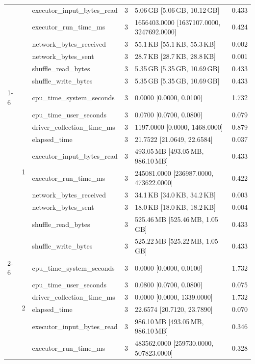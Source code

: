 \begin{tabular}{lllrll}
 &  & executor_input_bytes_read & 3 & 5.06\,GB [5.06\,GB, 10.12\,GB] & 0.433 \\
 &  & executor_run_time_ms & 3 & 1656403.0000 [1637107.0000, 3247692.0000] & 0.424 \\
 &  & network_bytes_received & 3 & 55.1\,KB [55.1\,KB, 55.3\,KB] & 0.002 \\
 &  & network_bytes_sent & 3 & 28.7\,KB [28.7\,KB, 28.8\,KB] & 0.001 \\
 &  & shuffle_read_bytes & 3 & 5.35\,GB [5.35\,GB, 10.69\,GB] & 0.433 \\
 &  & shuffle_write_bytes & 3 & 5.35\,GB [5.35\,GB, 10.69\,GB] & 0.433 \\
\cline{1-6} \cline{2-6}
\multirow[t]{30}{*}{national-scale-spatial-join-databricks-broadcast-4-nodes-small} & \multirow[t]{10}{*}{1} & cpu_time_system_seconds & 3 & 0.0000 [0.0000, 0.0100] & 1.732 \\
 &  & cpu_time_user_seconds & 3 & 0.0700 [0.0700, 0.0800] & 0.079 \\
 &  & driver_collection_time_ms & 3 & 1197.0000 [0.0000, 1468.0000] & 0.879 \\
 &  & elapsed_time & 3 & 21.7522 [21.0649, 22.6584] & 0.037 \\
 &  & executor_input_bytes_read & 3 & 493.05\,MB [493.05\,MB, 986.10\,MB] & 0.433 \\
 &  & executor_run_time_ms & 3 & 245081.0000 [236987.0000, 473622.0000] & 0.422 \\
 &  & network_bytes_received & 3 & 34.1\,KB [34.0\,KB, 34.2\,KB] & 0.003 \\
 &  & network_bytes_sent & 3 & 18.0\,KB [18.0\,KB, 18.2\,KB] & 0.004 \\
 &  & shuffle_read_bytes & 3 & 525.46\,MB [525.46\,MB, 1.05\,GB] & 0.433 \\
 &  & shuffle_write_bytes & 3 & 525.22\,MB [525.22\,MB, 1.05\,GB] & 0.433 \\
\cline{2-6}
 & \multirow[t]{10}{*}{2} & cpu_time_system_seconds & 3 & 0.0000 [0.0000, 0.0100] & 1.732 \\
 &  & cpu_time_user_seconds & 3 & 0.0800 [0.0700, 0.0800] & 0.075 \\
 &  & driver_collection_time_ms & 3 & 0.0000 [0.0000, 1339.0000] & 1.732 \\
 &  & elapsed_time & 3 & 22.6574 [20.7120, 23.7890] & 0.070 \\
 &  & executor_input_bytes_read & 3 & 986.10\,MB [493.05\,MB, 986.10\,MB] & 0.346 \\
 &  & executor_run_time_ms & 3 & 483562.0000 [259730.0000, 507823.0000] & 0.328 \\

\end{tabular}
